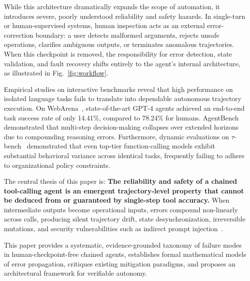 \documentclass[conference]{IEEEtran}
\begin{document}
While this architecture dramatically expands the scope of automation, it introduces severe, poorly understood reliability and safety hazards. In single-turn or human-supervised systems, human inspection acts as an external error-correction boundary: a user detects malformed arguments, rejects unsafe operations, clarifies ambiguous outputs, or terminates anomalous trajectories. When this checkpoint is removed, the responsibility for error detection, state validation, and fault recovery shifts entirely to the agent's internal architecture, as illustrated in Fig.~\ref{fig:workflow}.

Empirical studies on interactive benchmarks reveal that high performance on isolated language tasks fails to translate into dependable autonomous trajectory execution. On WebArena~\cite{zhou2024webarena}, state-of-the-art GPT-4 agents achieved an end-to-end task success rate of only 14.41\%, compared to 78.24\% for humans. AgentBench~\cite{liu2024agentbench} demonstrated that multi-step decision-making collapses over extended horizons due to compounding reasoning errors. Furthermore, dynamic evaluations on $\tau$-bench~\cite{yao2025taubench} demonstrated that even top-tier function-calling models exhibit substantial behavioral variance across identical tasks, frequently failing to adhere to organizational policy constraints.

The central thesis of this paper is: \textbf{The reliability and safety of a chained tool-calling agent is an emergent trajectory-level property that cannot be deduced from or guaranteed by single-step tool accuracy.} When intermediate outputs become operational inputs, errors compound non-linearly across calls, producing silent trajectory drift, state desynchronization, irreversible mutations, and security vulnerabilities such as indirect prompt injection~\cite{debenedetti2024agentdojo}.

This paper provides a systematic, evidence-grounded taxonomy of failure modes in human-checkpoint-free chained agents, establishes formal mathematical models of error propagation, critiques existing mitigation paradigms, and proposes an architectural framework for verifiable autonomy.
\end{document}
